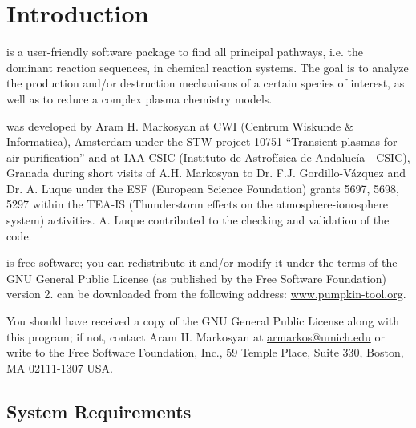 
\chapter{Introduction}
\label{chap_1}
\pump{} is a user-friendly software package to find all principal pathways, i.e. the dominant reaction sequences, in chemical reaction systems. The goal is to analyze the production and/or destruction mechanisms of a certain species of interest, as well as to reduce a complex plasma chemistry models.

\pump{} was developed by Aram H. Markosyan at CWI (Centrum Wis\-kunde \& Informatica), Amsterdam under the STW project 10751 ``Transient plasmas for air purification'' and at IAA-CSIC (Instituto de Astrofísica de Andalucía - CSIC), Granada during short visits of A.H. Markosyan to Dr. F.J. Gordillo-V\'{a}zquez and Dr. A. Luque under the ESF (European Science Foundation) grants 5697, 5698, 5297 within the TEA-IS (Thunderstorm effects on the atmosphere-ionosphere system) activities. A. Luque contributed to the checking and validation of the code.

\pump{} is free software; you can redistribute it and/or modify it under the terms of the GNU General Public License (as published by the Free Software Foundation) version 2. \pump{} can be downloaded from the following address: \url{www.pumpkin-tool.org}.

You should have received a copy of the GNU General Public License along with this program; if not, contact Aram H. Markosyan at \url{armarkos@umich.edu} or write to the Free Software Foundation, Inc., 59 Temple Place, Suite 330, Boston, MA 02111-1307 USA.


\section{System Requirements}
\label{sec_1_1}

